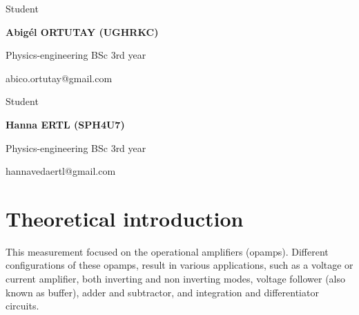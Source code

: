 \documentclass[12pt]{article}
\begin{document}
\begin{titlepage}
\vfill

\begin{minipage}[t]{0.47\textwidth}
    \centering

    {\Large {Student}\par}

    \vspace{0.1cm}

    {\bfseries
    Abigél ORTUTAY (UGHRKC)\par}
     {\normalsize
    Physics-engineering BSc 3rd year\par}
    {\normalsize
    abico.ortutay@gmail.com}
    
\end{minipage}
\hfill
\begin{minipage}[t]{0.47\textwidth}
    \centering

    {\Large {Student}\par}
   

    \vspace{0.1cm}

    {\bfseries
    Hanna ERTL (SPH4U7)\par}
    {\normalsize
    Physics-engineering BSc 3rd year\par}
    {\normalsize
    hannavedaertl@gmail.com}
    
    
\end{minipage}

\vspace{1.3cm}

\end{titlepage}


\begin{abstract}
    \noindent 
    This work presents the results obtained from the laboratory session focusing on the operation of different amplifier configurations including the inverting amplifier, adder amplifier, non-inverting voltage follower, differentiator and integrator. The voltage gain, saturation and upper cutoff frequency are determined experimentally. The differentiator and integrator circuits were studied using sinusoidal, square and triangular input waveforms, and the effects of additional feedback components were investigated. 
\end{abstract}

\section{Theoretical introduction} 
This measurement focused on the operational amplifiers (opamps). Different configurations of these opamps, result in various applications, such as a voltage or current amplifier, both inverting and non inverting modes, voltage follower (also known as buffer), adder and subtractor, and integration and differentiator circuits.
\end{document}

